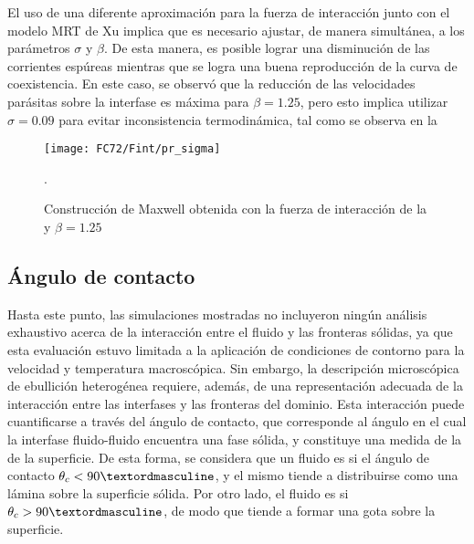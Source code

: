 El uso de una diferente aproximaci\'on para la fuerza de interacci\'on junto con el modelo MRT de Xu implica que es necesario ajustar, de manera simult\'anea, a los par\'ametros $\sigma$ y $\beta$. De esta manera, es posible lograr una disminuci\'on de las corrientes esp\'ureas mientras que se logra una buena reproducci\'on de la curva de coexistencia. En este caso, se observ\'o que la reducci\'on de las velocidades par\'asitas sobre la interfase es m\'axima para $\beta=1.25$, pero esto implica utilizar $\sigma=0.09$ para evitar inconsistencia termodin\'amica, tal como se observa en la 

\begin{figure}[ht]
	\centering
	\texttt{[image: FC72/Fint/pr\_sigma]}
	\caption{Construcci\'on de Maxwell obtenida con la fuerza de interacci\'on de la  y $\beta=1.25$}.
	\label{fig:pr_sigma_beta}
\end{figure}



\subsection{\'Angulo de contacto}

Hasta este punto, las simulaciones mostradas no incluyeron ning\'un an\'alisis exhaustivo acerca de la interacci\'on entre el fluido y las fronteras s\'olidas, ya que esta evaluaci\'on estuvo limitada a la aplicaci\'on de condiciones de contorno para la velocidad y temperatura macrosc\'opica. Sin embargo, la descripci\'on microsc\'opica de ebullici\'on heterog\'enea requiere, adem\'as, de una representaci\'on adecuada de la interacci\'on entre las interfases y las fronteras del dominio. Esta interacci\'on puede cuantificarse a trav\'es del \'angulo de contacto, que corresponde al \'angulo en el cual la interfase fluido-fluido encuentra una fase s\'olida, y constituye una medida de la  de la superficie. De esta forma, se considera que un fluido es  si el \'angulo de contacto $\theta_c < 90 \textordmasculine$, y el mismo tiende a distribuirse como una l\'amina sobre la superficie s\'olida. Por otro lado, el fluido es  si $\theta_c > 90 \textordmasculine$, de modo que tiende a formar una gota sobre la superficie.

